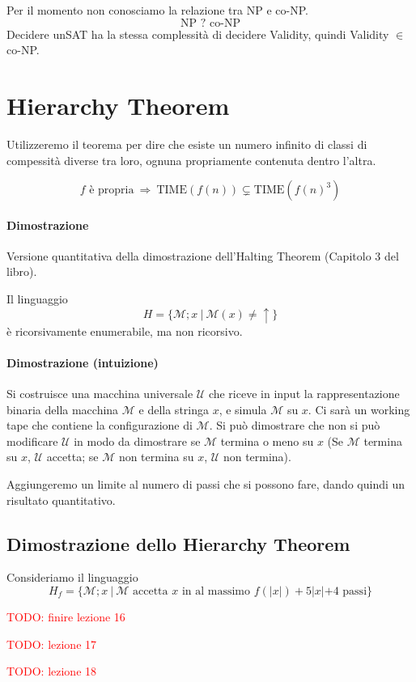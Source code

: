 Per il momento non conosciamo la relazione tra NP e co-NP.
$$
    \text{NP } ? \text{ co-NP}
$$
Decidere unSAT ha la stessa complessità di decidere Validity, quindi Validity $\in$ co-NP.



\section{Hierarchy Theorem}
Utilizzeremo il teorema per dire che esiste un numero infinito di classi di compessità diverse tra loro, ognuna propriamente contenuta dentro l'altra.

\begin{theorem}
    $$
        f \text{ è propria}
        ~\Rightarrow~
        \text{TIME}(f(n)) \subsetneq \text{TIME}(f(n)^3)
    $$
\end{theorem}
\paragraph{Dimostrazione} Versione quantitativa della dimostrazione dell'Halting Theorem (Capitolo 3 del libro).

\begin{theorem}
    Il linguaggio
    $$
        H = \{ \mathcal{M};x ~|~ \mathcal{M}(x)\neq\uparrow \}
    $$
    è ricorsivamente enumerabile, ma non ricorsivo.
\end{theorem}
\paragraph{Dimostrazione (intuizione)} Si costruisce una macchina universale $\mathcal{U}$ che riceve in input la rappresentazione binaria della macchina $\mathcal{M}$ e della stringa $x$, e simula $\mathcal{M}$ su $x$. Ci sarà un working tape che contiene la configurazione di $\mathcal{M}$. Si può dimostrare che non si può modificare $\mathcal{U}$ in modo da dimostrare se $\mathcal{M}$ termina o meno su $x$ (Se $\mathcal{M}$ termina su $x$, $\mathcal{U}$ accetta; se $\mathcal{M}$ non termina su $x$, $\mathcal{U}$ non termina). 

Aggiungeremo un limite al numero di passi che si possono fare, dando quindi un risultato quantitativo.



\subsection{Dimostrazione dello Hierarchy Theorem}
Consideriamo il linguaggio 
$$
    H_f = \{ \mathcal{M};x ~|~ \mathcal{M} \text{ accetta $x$ in al massimo } f(|x|)+5|x|+4 \text{ passi}  \}
$$




\textcolor{Red}{TODO: finire lezione 16}

\textcolor{Red}{TODO: lezione 17}

\textcolor{Red}{TODO: lezione 18}
